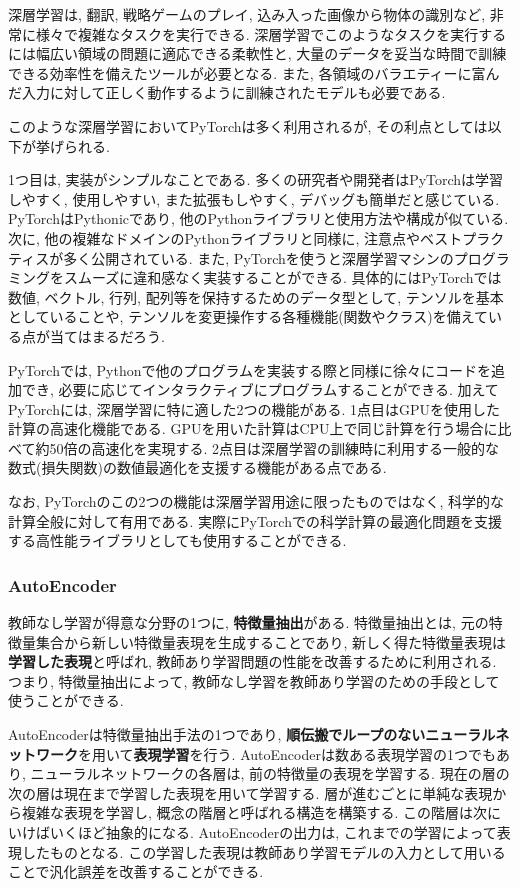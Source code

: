 \documentclass[dvipdfmx]{jsarticle}
\begin{document}
深層学習は, 翻訳, 戦略ゲームのプレイ, 込み入った画像から物体の識別など, 非常に様々で複雑なタスクを実行できる.
深層学習でこのようなタスクを実行するには幅広い領域の問題に適応できる柔軟性と, 大量のデータを妥当な時間で訓練できる効率性を備えたツールが必要となる.
また, 各領域のバラエティーに富んだ入力に対して正しく動作するように訓練されたモデルも必要である.

このような深層学習においてPyTorchは多く利用されるが, その利点としては以下が挙げられる.

1つ目は, 実装がシンプルなことである.
多くの研究者や開発者はPyTorchは学習しやすく, 使用しやすい, また拡張もしやすく, デバッグも簡単だと感じている.
PyTorchはPythonicであり, 他のPythonライブラリと使用方法や構成が似ている.
次に, 他の複雑なドメインのPythonライブラリと同様に, 注意点やベストプラクティスが多く公開されている.
また, PyTorchを使うと深層学習マシンのプログラミングをスムーズに違和感なく実装することができる.
具体的にはPyTorchでは数値, ベクトル, 行列, 配列等を保持するためのデータ型として, テンソルを基本としていることや, テンソルを変更操作する各種機能(関数やクラス)を備えている点が当てはまるだろう.

PyTorchでは, Pythonで他のプログラムを実装する際と同様に徐々にコードを追加でき, 必要に応じてインタラクティブにプログラムすることができる.
加えてPyTorchには, 深層学習に特に適した2つの機能がある.
1点目はGPUを使用した計算の高速化機能である.
GPUを用いた計算はCPU上で同じ計算を行う場合に比べて約50倍の高速化を実現する.
2点目は深層学習の訓練時に利用する一般的な数式(損失関数)の数値最適化を支援する機能がある点である.

なお, PyTorchのこの2つの機能は深層学習用途に限ったものではなく, 科学的な計算全般に対して有用である.
実際にPyTorchでの科学計算の最適化問題を支援する高性能ライブラリとしても使用することができる.



\subsubsection{AutoEncoder}
教師なし学習が得意な分野の1つに, \textbf{特徴量抽出}がある.
特徴量抽出とは, 元の特徴量集合から新しい特徴量表現を生成することであり, 新しく得た特徴量表現は\textbf{学習した表現}と呼ばれ, 
教師あり学習問題の性能を改善するために利用される.
つまり, 特徴量抽出によって, 教師なし学習を教師あり学習のための手段として使うことができる.

AutoEncoderは特徴量抽出手法の1つであり, \textbf{順伝搬でループのないニューラルネットワーク}を用いて\textbf{表現学習}を行う.
AutoEncoderは数ある表現学習の1つでもあり, ニューラルネットワークの各層は, 前の特徴量の表現を学習する.
現在の層の次の層は現在まで学習した表現を用いて学習する.
層が進むごとに単純な表現から複雑な表現を学習し, 概念の階層と呼ばれる構造を構築する.
この階層は次にいけばいくほど抽象的になる.
AutoEncoderの出力は, これまでの学習によって表現したものとなる.
この学習した表現は教師あり学習モデルの入力として用いることで汎化誤差を改善することができる.
\end{document}
